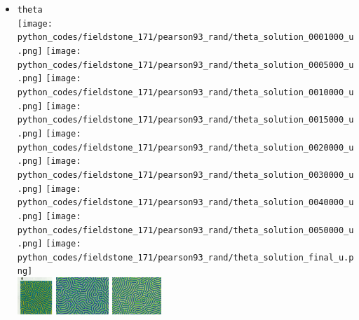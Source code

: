 \begin{itemize}
\item {\tt theta}\\
\texttt{[image: python\_codes/fieldstone\_171/pearson93\_rand/theta\_solution\_0001000\_u.png]}
\texttt{[image: python\_codes/fieldstone\_171/pearson93\_rand/theta\_solution\_0005000\_u.png]}
\texttt{[image: python\_codes/fieldstone\_171/pearson93\_rand/theta\_solution\_0010000\_u.png]}
\texttt{[image: python\_codes/fieldstone\_171/pearson93\_rand/theta\_solution\_0015000\_u.png]}
\texttt{[image: python\_codes/fieldstone\_171/pearson93\_rand/theta\_solution\_0020000\_u.png]}
\texttt{[image: python\_codes/fieldstone\_171/pearson93\_rand/theta\_solution\_0030000\_u.png]}
\texttt{[image: python\_codes/fieldstone\_171/pearson93\_rand/theta\_solution\_0040000\_u.png]}
\texttt{[image: python\_codes/fieldstone\_171/pearson93\_rand/theta\_solution\_0050000\_u.png]}
\texttt{[image: python\_codes/fieldstone\_171/pearson93\_rand/theta\_solution\_final\_u.png]}\\
\includegraphics[height=1.4cm]{python_codes/fieldstone_171/images/pear93_theta}
\includegraphics[height=1.4cm]{python_codes/fieldstone_171/images/munafo_theta1}
\includegraphics[height=1.4cm]{python_codes/fieldstone_171/images/munafo_theta2}





\end{itemize}
